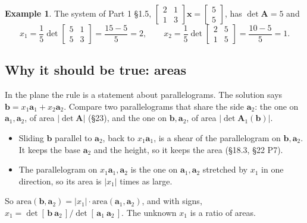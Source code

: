 \documentclass[11pt]{article}
\theoremstyle{plain}
\theoremstyle{definition}
\newtheorem{ex}{Example}[section]
\theoremstyle{remark}
\newcommand{\vc}[1]{\mathbf{#1}}
\newcommand{\mt}[1]{\mathbf{#1}}
\begin{document}
\begin{ex}
The system of Part 1 \S1.5,
$\begin{bmatrix}2&1\\1&3\end{bmatrix}\vc{x}=\begin{bmatrix}5\\5\end{bmatrix}$, has
$\det\mt{A}=5$ and
\[
  x_1=\frac{1}{5}\det\begin{bmatrix}5&1\\5&3\end{bmatrix}=\frac{15-5}{5}=2,
  \qquad
  x_2=\frac{1}{5}\det\begin{bmatrix}2&5\\1&5\end{bmatrix}=\frac{10-5}{5}=1 .
\]
\end{ex}

\subsection{Why it should be true: areas}
In the plane the rule is a statement about parallelograms. The solution says
$\vc{b}=x_1\vc{a}_1+x_2\vc{a}_2$. Compare two parallelograms that share the side
$\vc{a}_2$: the one on $\vc{a}_1,\vc{a}_2$, of area $|\det\mt{A}|$ (\S23), and
the one on $\vc{b},\vc{a}_2$, of area $|\det\mt{A}_1(\vc{b})|$.
\begin{itemize}[leftmargin=1.4em,itemsep=3pt]
  \item Sliding $\vc{b}$ parallel to $\vc{a}_2$, back to $x_1\vc{a}_1$, is a
        shear of the parallelogram on $\vc{b},\vc{a}_2$. It keeps the base
        $\vc{a}_2$ and the height, so it keeps the area (\S18.3, \S22 P7).
  \item The parallelogram on $x_1\vc{a}_1,\vc{a}_2$ is the one on
        $\vc{a}_1,\vc{a}_2$ stretched by $x_1$ in one direction, so its area is
        $|x_1|$ times as large.
\end{itemize}
So $\text{area}(\vc{b},\vc{a}_2)=|x_1|\cdot\text{area}(\vc{a}_1,\vc{a}_2)$, and
with signs, $x_1=\det[\,\vc{b}\ \vc{a}_2\,]/\det[\,\vc{a}_1\ \vc{a}_2\,]$. The
unknown $x_1$ is a ratio of areas.
\end{document}
